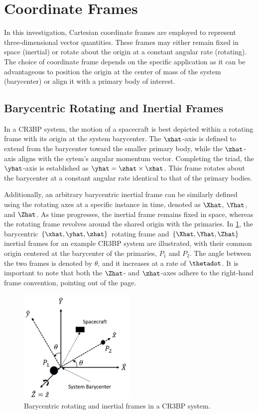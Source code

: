 \section{Coordinate Frames}
In this investigation, Cartesian coordinate frames are employed to represent \\three-dimensional
vector quantities. These frames may either remain fixed in space (inertial) or rotate about the
origin at a constant angular rate (rotating). The choice of coordinate frame depends on the
specific application as it can be advantageous to position the origin at the center of mass of the
system (barycenter) or align it with a primary body of interest.

\subsection{Barycentric Rotating and Inertial Frames}
In a CR3BP system, the motion of a spacecraft is best depicted within a rotating frame with its
origin at the system barycenter. The $\xhat$-axis is defined to extend from the barycenter toward
the smaller primary body, while the $\zhat$-axis aligns with the sytem's angular momentum vector.
Completing the triad, the $\yhat$-axis is established as $\yhat=\zhat\times\xhat$. This frame
rotates about the barycenter at a constant angular rate identical to that of the primary bodies.

Additionally, an arbitrary barycentric inertial frame can be similarly defined using the rotating
axes at a specific instance in time, denoted as $\Xhat$, $\Yhat$, and $\Zhat$. As time progresses,
the inertial frame remains fixed in space, whereas the rotating frame revolves around the shared
origin with the primaries. In \cref{fig:baryFrames}, the barycentric $\{\xhat,\yhat,\zhat\}$
rotating frame and $\{\Xhat,\Yhat,\Zhat\}$ inertial frames for an example CR3BP system are
illustrated, with their common origin centered at the barycenter of the primaries, $P_{1}$ and
$P_{2}$. The angle between the two frames is denoted by $\theta$, and it increases at a rate of
$\thetadot$. It is important to note that both the $\Zhat$- and $\zhat$-axes adhere to the
right-hand frame convention, pointing out of the page.

\begin{figure}[ht]
    \centering
    \includegraphics[width=0.5\textwidth]{figures/BaryFrames.jpg}
    \caption{Barycentric rotating and inertial frames in a CR3BP system.}
    \label{fig:baryFrames}
\end{figure}

